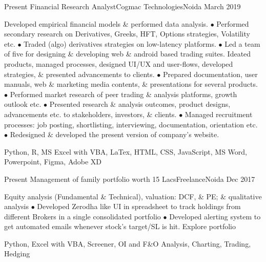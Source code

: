 
\begin{experiences}
  \experience
    {Present}   {Financial Research Analyst}{Cogmac Technologies}{Noida}
    {March 2019}
    {
\begin{description}
Developed empirical financial models \& performed data analysis. $\bullet$ Performed secondary research on Derivatives, Greeks, HFT, Options strategies, Volatility etc. $\bullet$ Traded (algo) derivatives strategies on low-latency platforms. $\bullet$ Led a team of five for designing \& developing web \& android based trading suites. Ideated products, managed processes, designed UI/UX and user-flows, developed strategies, \& presented advancements to clients. $\bullet$ Prepared documentation, user manuals, web \& marketing media contents, \& presentations for several products. $\bullet$ Performed market research of peer trading \& analysis platforms, growth outlook etc. $\bullet$ Presented research \& analysis outcomes, product designs, advancements etc. to stakeholders, investors, \& clients. $\bullet$ Managed recruitment processes: job posting, shortlisting, interviewing, documentation, orientation etc. $\bullet$ Redesigned \& developed the present version of company's website. \hspace \hfill {}
\end{description}
}
        {Python, R, MS Excel with VBA, LaTex, HTML, CSS, JavaScript, MS Word, Powerpoint, Figma, Adobe XD}
\end{experiences}
\vspace*{-15px} 
\begin{experiences}
   \experience
    {Present}{\vspace*{-15px} Management of family portfolio worth 15 Lacs}{Freelance}{Noida}
    {Dec 2017}
    {
\begin{description}
        Equity analysis (Fundamental \& Technical), valuation: DCF, \& PE; \& qualitative analysis $\bullet$ Developed Zerodha like UI in spreadsheet to track holdings from different Brokers in a single consolidated portfolio $\bullet$ Developed alerting system to get automated emails whenever stock's target/SL is hit. \hfill {} {\footnotesize{Explore portfolio}}
    \end{description}
    }
        {Python, Excel with VBA, Screener, OI and F\&O Analysis, Charting, Trading, Hedging}
\end{experiences}
